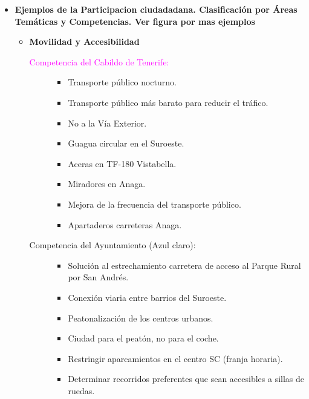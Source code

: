 \begin{itemize}
    \item \textbf{Ejemplos de la Participacion ciudadadana. Clasificación por Áreas Temáticas y Competencias. Ver figura por mas ejemplos}
    \begin{itemize}
        \item \textbf{Movilidad y Accesibilidad}
        \begin{description}
            \item[\textcolor{magenta}{Competencia del Cabildo de Tenerife:}]
            \begin{itemize}
                \item Transporte público nocturno.
                \item Transporte público más barato para reducir el tráfico.
                \item No a la Vía Exterior.
                \item Guagua circular en el Suroeste.
                \item Aceras en TF-180 Vistabella.
                \item Miradores en Anaga.
                \item Mejora de la frecuencia del transporte público.
                \item Apartaderos carreteras Anaga.
            \end{itemize}
            \item[Competencia del Ayuntamiento (Azul claro):]
            \begin{itemize}
                \item Solución al estrechamiento carretera de acceso al Parque Rural por San Andrés.
                \item Conexión viaria entre barrios del Suroeste.
                \item Peatonalización de los centros urbanos.
                \item Ciudad para el peatón, no para el coche.
                \item Restringir aparcamientos en el centro SC (franja horaria).
                \item Determinar recorridos preferentes que sean accesibles a sillas de ruedas.
            \end{itemize}
        \end{description}


\end{itemize}
\end{itemize}
